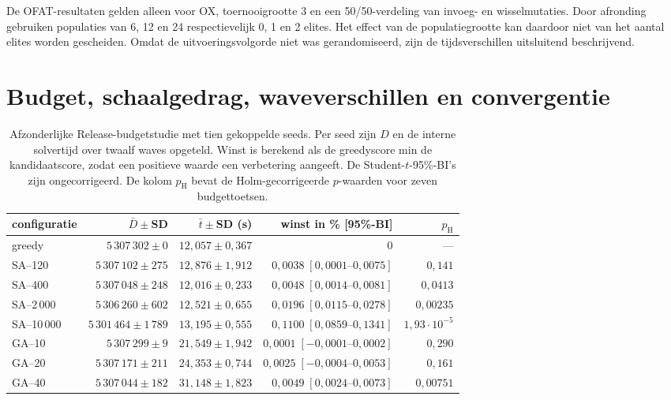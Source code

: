 \noindent De OFAT-resultaten gelden alleen voor OX, toernooigrootte 3 en een
50/50-verdeling van invoeg- en wisselmutaties. Door afronding gebruiken
populaties van 6, 12 en 24 respectievelijk 0, 1 en 2 elites. Het effect van de
populatiegrootte kan daardoor niet van het aantal elites worden gescheiden.
Omdat de uitvoeringsvolgorde niet was gerandomiseerd, zijn de tijdsverschillen
uitsluitend beschrijvend.
\endgroup

\clearpage
\section{Budget, schaalgedrag, waveverschillen en convergentie}
\label{app:matched}

\begingroup
\footnotesize
\setlength{\tabcolsep}{2.2pt}
\setlength{\intextsep}{5pt}
\setlength{\abovecaptionskip}{3pt}
\setlength{\belowcaptionskip}{2pt}
\renewcommand{\arraystretch}{0.94}

\begin{table}[H]
\centering
\caption{Afzonderlijke Release-budgetstudie met tien gekoppelde seeds. Per seed
zijn $D$ en de interne solvertijd over twaalf waves opgeteld. Winst is berekend
als de greedyscore min de kandidaatscore, zodat een positieve waarde een
verbetering aangeeft. De Student-$t$-95\%-BI's zijn ongecorrigeerd. De kolom
$p_{\mathrm H}$ bevat de Holm-gecorrigeerde $p$-waarden voor zeven budgettoetsen.}
\label{tab:app-budget}
\begin{tabular}{@{}lrrrr@{}}
\toprule
\textbf{configuratie} & \textbf{$\bar D\pm$SD} & \textbf{$\bar t\pm$SD (s)} &
\textbf{winst in \% [95\%-BI]} & \textbf{$p_{\mathrm H}$} \\
\midrule
greedy       & $5\,307\,302\pm0$      & $12,057\pm0,367$ & $0$ & --- \\
SA--120      & $5\,307\,102\pm275$    & $12,876\pm1,912$ & $0,0038\;[0,0001\text{--}0,0075]$ & $0,141$ \\
SA--400      & $5\,307\,048\pm248$    & $12,016\pm0,233$ & $0,0048\;[0,0014\text{--}0,0081]$ & $0,0413$ \\
SA--2\,000  & $5\,306\,260\pm602$    & $12,521\pm0,655$ & $0,0196\;[0,0115\text{--}0,0278]$ & $0,00235$ \\
SA--10\,000 & $5\,301\,464\pm1\,789$ & $13,195\pm0,555$ & $0,1100\;[0,0859\text{--}0,1341]$ & $1,93\!\cdot\!10^{-5}$ \\
GA--10       & $5\,307\,299\pm9$      & $21,549\pm1,942$ & $0,0001\;[-0,0001\text{--}0,0002]$ & $0,290$ \\
GA--20       & $5\,307\,171\pm211$    & $24,353\pm0,744$ & $0,0025\;[-0,0004\text{--}0,0053]$ & $0,161$ \\
GA--40       & $5\,307\,044\pm182$    & $31,148\pm1,823$ & $0,0049\;[0,0024\text{--}0,0073]$ & $0,00751$ \\
\bottomrule
\end{tabular}
\end{table}

